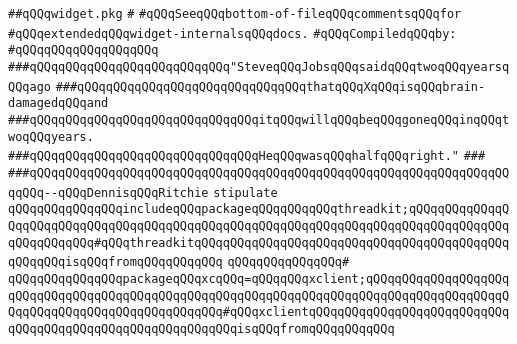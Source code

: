 \label{src/lib/x-kit/widget/old/basic/widget.pkg}
\verb|##qQQqwidget.pkg|\newline
\verb|#|\newline
\verb|#qQQqSeeqQQqbottom-of-fileqQQqcommentsqQQqfor|\newline
\verb|#qQQqextendedqQQqwidget-internalsqQQqdocs.|\newline
\newline
\verb|#qQQqCompiledqQQqby:|\newline
\verb|#qQQqqQQqqQQqqQQqqQQq|\newline
\newline
\newline
\newline
\verb|###qQQqqQQqqQQqqQQqqQQqqQQqqQQq"SteveqQQqJobsqQQqsaidqQQqtwoqQQqyearsqQQqago|\newline
\verb|###qQQqqQQqqQQqqQQqqQQqqQQqqQQqqQQqthatqQQqXqQQqisqQQqbrain-damagedqQQqand|\newline
\verb|###qQQqqQQqqQQqqQQqqQQqqQQqqQQqqQQqitqQQqwillqQQqbeqQQqgoneqQQqinqQQqtwoqQQqyears.|\newline
\verb|###qQQqqQQqqQQqqQQqqQQqqQQqqQQqqQQqHeqQQqwasqQQqhalfqQQqright."|\newline
\verb|###|\newline
\verb|###qQQqqQQqqQQqqQQqqQQqqQQqqQQqqQQqqQQqqQQqqQQqqQQqqQQqqQQqqQQqqQQqqQQqqQQq--qQQqDennisqQQqRitchie|\newline
\newline
\newline
\newline
\verb|stipulate|\newline
\verb|qQQqqQQqqQQqqQQqincludeqQQqpackageqQQqqQQqqQQqthreadkit;qQQqqQQqqQQqqQQqqQQqqQQqqQQqqQQqqQQqqQQqqQQqqQQqqQQqqQQqqQQqqQQqqQQqqQQqqQQqqQQqqQQqqQQqqQQqqQQq#qQQqthreadkitqQQqqQQqqQQqqQQqqQQqqQQqqQQqqQQqqQQqqQQqqQQqqQQqqQQqisqQQqfromqQQqqQQqqQQq|\newline
\verb|qQQqqQQqqQQqqQQq#|\newline
\verb|qQQqqQQqqQQqqQQqpackageqQQqxcqQQq=qQQqqQQqxclient;qQQqqQQqqQQqqQQqqQQqqQQqqQQqqQQqqQQqqQQqqQQqqQQqqQQqqQQqqQQqqQQqqQQqqQQqqQQqqQQqqQQqqQQqqQQqqQQqqQQqqQQqqQQqqQQqqQQqqQQq#qQQqxclientqQQqqQQqqQQqqQQqqQQqqQQqqQQqqQQqqQQqqQQqqQQqqQQqqQQqqQQqqQQqisqQQqfromqQQqqQQqqQQq|\newline
